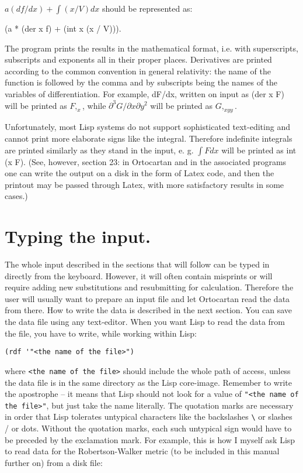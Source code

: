 \bigskip

\noindent $a(df/dx) + \int (x/V)dx$ should be represented as:

\bigskip

(a * (der x f) + (int x (x / V))).

\bigskip

The program prints  the  results  in  the  mathematical
     format, i.e. with superscripts, subscripts and exponents all
     in their proper places. Derivatives are printed according to
     the common convention in general relativity: the name of the
     function  is  followed  by the comma and by subscripts being
     the names of the variables of differentiation. For  example,
dF/dx,  written  on  input  as  (der x F) will be printed as $F,_x$, while
$\partial^3G/\partial x \partial y^2$ will be printed as $G,_{xyy}$.

Unfortunately, most Lisp systems do not support sophisticated text-editing  and
cannot print more elaborate signs like the integral. Therefore  indefinite
integrals are printed similarly as  they  stand  in the input, e. g. $\int Fdx$
will be printed as  int (x F). (See, however, section 23: in Ortocartan and in
the associated programs one can write the output on a disk in the form of Latex
code, and then the printout may be passed through Latex, with more satisfactory
results in some cases.)

\section{Typing the input.}

The whole input described in  the  sections  that  will follow can be typed in
directly  from  the  keyboard. However, it will often contain misprints or will
require adding new substitutions and resubmitting  for calculation. Therefore
the user will usually want to  prepare  an
     input file and let Ortocartan read the data from there.  How
to write the data is described in the next section. You can save the data file
using any text-editor. When you want Lisp to read the data from the file, you
have to write, while working within Lisp:

\bigskip

\begin{verbatim}
(rdf '"<the name of the file>")
\end{verbatim}

\bigskip

\noindent where \verb+<the name of the file>+ should include the whole path of
access, unless the data file is in the same directory as the Lisp core-image.
Remember to write the apostrophe -- it means that Lisp should not look for a
value of \verb+"<the name of the file>"+, but just take the name literally. The
quotation marks are necessary in order that Lisp tolerates untypical characters
like the backslashes \verb+\+ or slashes / or dots. Without the quotation
marks, each such untypical sign would have to be preceded by the exclamation
mark. For example, this is how I myself ask Lisp to read data for the
Robertson-Walker metric (to be included in this manual further on) from a disk
file:


